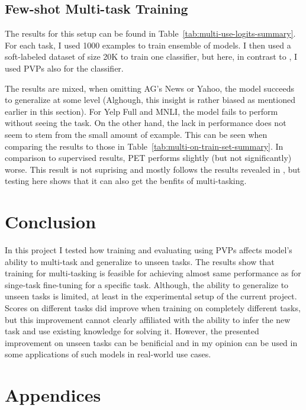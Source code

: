 \documentclass[11pt,a4paper]{article}
\begin{document}

\subsection*{Few-shot Multi-task Training}
The results for this setup can be found in Table~\ref{tab:multi-use-logits-summary}.
For each task, I used 1000 examples to train ensemble of models.
I then used a soft-labeled dataset of size 20K to train one classifier, but here, in contrast to \citet{schick2020exploiting}, I used PVPs also for the classifier.

The results are mixed, when omitting AG's News or Yahoo, the model succeeds to generalize at some level (Alghough, this insight is rather biased as mentioned earlier in this section).
For Yelp Full and MNLI, the model fails to perform without seeing the task.
On the other hand, the lack in performance does not seem to stem from the small amount of example.
This can be seen when comparing the results to those in Table~\ref{tab:multi-on-train-set-summary}.
In comparison to supervised results, PET performs slightly (but not significantly) worse.
This result is not suprising and mostly follows the results revealed in \citet{schick2020exploiting}, but testing here shows that it can also get the benfits of multi-tasking.

\section{Conclusion}
In this project I tested how training and evaluating using PVPs affects model's ability to multi-task and generalize to unseen tasks.
The results show that training for multi-tasking is feasible for achieving almost same performance as for singe-task fine-tuning for a specific task.
Although, the ability to generalize to unseen tasks is limited, at least in the experimental setup of the current project.
Scores on different tasks did improve when training on completely different tasks, but this improvement cannot clearly affiliated with the ability to infer the new task and use existing knowledge for solving it. 
However, the presented improvement on unseen tasks can be benificial and in my opinion can be used in some applications of such models in real-world use cases. 




\newpage
\appendix


\section{Appendices}
\label{sec:appendix}
\end{document}
